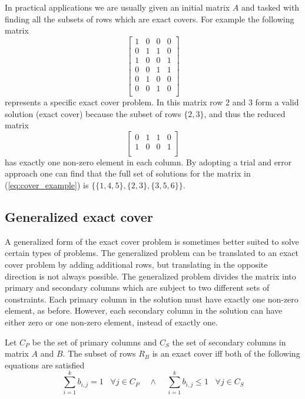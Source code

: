\begin{example}
In practical applications we are usually given an initial matrix $A$ and tasked with finding all the subsets of rows which are exact covers.
For example the following matrix
\begin{equation}
	\left[
	\begin{array}{cccc}
		1 & 0 & 0 & 0 \\
		0 & 1 & 1 & 0 \\
		1 & 0 & 0 & 1 \\
		0 & 0 & 1 & 1 \\
		0 & 1 & 0 & 0 \\
		0 & 0 & 1 & 0 \\
	\end{array}
	\right]
	\label{eq:cover_example}
\end{equation}
represents a specific exact cover problem.
In this matrix row 2 and 3 form a valid solution (exact cover) because the subset of rows $\{ 2, 3 \}$, and thus the reduced matrix
\[
\left[
\begin{array}{cccc}
	0 & 1 & 1 & 0 \\
	1 & 0 & 0 & 1 \\
\end{array}
\right]
\]
has exactly one non-zero element in each column.
By adopting a trial and error approach one can find that the full set of solutions for the matrix in (\ref{eq:cover_example}) is $\{ \{1, 4, 5 \}, \{ 2, 3\}, \{ 3, 5, 6\} \}$.
\end{example}


\subsection{Generalized exact cover}
\label{general_exact_cover}

A generalized form of the exact cover problem is sometimes better suited to solve certain types of problems.
The generalized problem can be translated to an exact cover problem by adding additional rows, but translating in the opposite direction is not always possible.
The generalized problem divides the matrix into primary and secondary columns which are subject to two different sets of constraints.
Each primary column in the solution must have exactly one non-zero element, as before.
However, each secondary column in the solution can have either zero or one non-zero element, instead of exactly one.

Let $C_P$ be the set of primary columns and $C_S$ the set of secondary columns in matrix $A$ and $B$.
The subset of rows $R_B$ is an exact cover iff both of the following equations are satisfied
\[
	\sum_{i = 1}^{k} b_{i,j} = 1 \;\;\; \forall j \in C_P  \;\;\;\; \wedge \;\;\;\;  \sum_{i = 1}^{k} b_{i,j} \leq 1 \;\;\; \forall j \in C_S
\]


